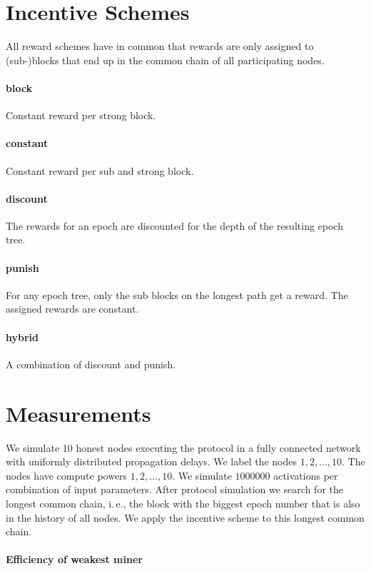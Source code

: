 \documentclass{article}
\begin{document}
\section{Incentive Schemes}

All reward schemes have in common that rewards are only assigned to (sub-)blocks that end up in the common chain of all participating nodes.

\paragraph{block}
Constant reward per strong block.

\paragraph{constant}
Constant reward per sub and strong block.

\paragraph{discount}
The rewards for an epoch are discounted for the depth of the resulting epoch tree.

\paragraph{punish}
For any epoch tree, only the sub blocks on the longest path get a reward. The assigned rewards are constant.

\paragraph{hybrid}
A combination of discount and punish.

\section{Measurements}

We simulate 10 honest nodes executing the protocol in a fully connected network with uniformly distributed propagation delays.
We label the nodes $1, 2, \dots, 10$. The nodes have compute powers $1, 2, \dots, 10$.
We simulate $1 000 000$ activations per combination of input parameters.
After protocol simulation we search for the longest common chain, i.\,e., the block with the biggest epoch number that is also in the history of all nodes.
We apply the incentive scheme to this longest common chain.

\paragraph{Efficiency of weakest miner}
\end{document}
